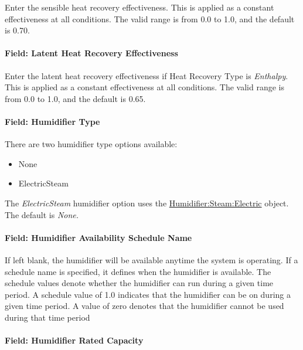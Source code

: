 Enter the sensible heat recovery effectiveness. This is applied as a constant effectiveness at all conditions. The valid range is from 0.0 to 1.0, and the default is 0.70.

\paragraph{Field: Latent Heat Recovery Effectiveness}\label{field-latent-heat-recovery-effectiveness-2}

Enter the latent heat recovery effectiveness if Heat Recovery Type is \emph{Enthalpy}. This is applied as a constant effectiveness at all conditions. The valid range is from 0.0 to 1.0, and the default is 0.65.

\paragraph{Field: Humidifier Type}\label{field-humidifier-type-1}

There are two humidifier type options available:

\begin{itemize}
\item
  None
\item
  ElectricSteam
\end{itemize}

The \emph{ElectricSteam} humidifier option uses the \hyperref[humidifiersteamelectric]{Humidifier:Steam:Electric} object. The default is \emph{None.}

\paragraph{Field: Humidifier Availability Schedule Name}\label{field-humidifier-availability-schedule-name-1}

If left blank, the humidifier will be available anytime the system is operating. If a schedule name is specified, it defines when the humidifier is available. The schedule values denote whether the humidifier can run during a given time period. A schedule value of 1.0 indicates that the humidifier can be on during a given time period. A value of zero denotes that the humidifier cannot be used during that time period

\paragraph{Field: Humidifier Rated Capacity}\label{field-humidifier-rated-capacity-1}

